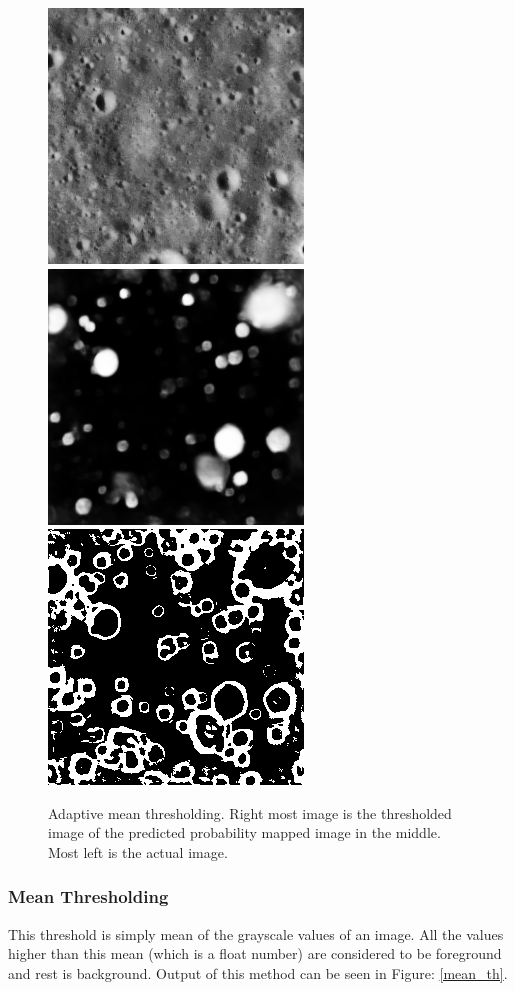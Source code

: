 \documentclass[11pt]{article}
\begin{document}
\begin{figure}[H]
	\includegraphics[width=.3\textwidth]{files/results/26.png}\hfill	
	\includegraphics[width=.3\textwidth]{files/results/26_predict.png}\hfill
	\includegraphics[width=.3\textwidth]{files/results/adaptiveMean_mean.png}\hfill
	\caption{Adaptive mean thresholding. Right most image is the thresholded image of the predicted probability mapped image in the middle. Most left is the actual image.}
	\label{Adaptive mean thresholding}
\end{figure}

\subsubsection{Mean Thresholding}
This threshold is simply mean of the grayscale values of an image. All the values higher than this mean (which is a float number) are considered to be foreground and rest is background. Output of this method can be seen in Figure: \ref{mean_th}.
\end{document}
